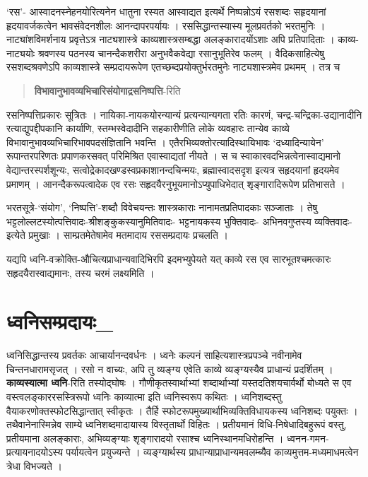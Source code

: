 ‘रस’- आस्वादनस्नेहनयोरित्यनेन धातुना रस्यत आस्वाद्यत इत्यर्थे निष्पन्नोऽयं रसशब्दः सहृदयानां हृदयावर्जकत्वेन भावसंवेदनशीलः आनन्दापरपर्यायः । रससिद्धान्तस्यास्य मूलप्रवर्तको भरतमुनिः । नाट्यांशविमर्शनाय प्रवृत्तेऽत्र नाट्यशास्त्रे काव्यशास्त्रसम्बद्धा अलङ्कारादयोंऽशाः अपि प्रतिपादिताः । काव्य-नाट्ययोः श्रवणस्य पठनस्य चानन्दैकशरीरा अनुभवैकवेद्या रसानुभूतिरेव फलम् । वैदिकसाहित्येषु रसशब्दश्रवणेऽपि काव्यशास्त्रे सम्प्रदायरूपेण एतच्छब्दप्रयोक्तुर्भरतमुनेः नाट्यशास्त्रमेव प्रथमम् । तत्र च 

\begin{verse}
\textbf{विभावानुभावव्यभिचारिसंयोगाद्रसनिष्पत्ति}-रिति 
\end{verse}

रसनिष्पत्तिप्रकारः सूत्रितः । नायिका-नायकयोरन्यान्यं प्रत्यन्यान्यगता रतिः कारणं, चन्द्र-चन्द्रिका-उद्यानादीनि रत्याद्युपद्दीपकानि कार्याणि, स्तम्भस्वेदादीनि सहकारीणीति लोके व्यवहारः तान्येव काव्ये विभावानुभावव्यभिचारिभावपदसंज्ञितानि भवन्ति । एतैरभिव्यक्तोरत्यादिस्थायिभावः ‘दध्यादिन्यायेन’ रूपान्तरपरिणतः प्रपाणकरसवत् परिमिश्रित एवास्वाद्यतां नीयते । स च स्वाकारवदभिन्नत्वेनास्वाद्यमानो वेद्यान्तरस्पर्शशून्यः, सत्वोद्रेकादखण्डस्वप्रकाशानन्दचिन्मयः, ब्रह्मास्वादसदृश इत्यत्र सहृदयानां हृदयमेव प्रमाणम् । आनन्दैकरूपत्वादेक एव रसः सहृदयैरनुभूयमानोऽप्युपाधिभेदात् शृङ्गारादिरूपेण प्रतिभासते ।

भरतसूत्रे-‘संयोग’, ‘निष्पत्ति’-शब्दौ विवेचयन्तः शास्त्रकाराः नानामतप्रतिपादकाः सञ्जाताः । तेषु भट्टलोल्लटस्योत्पत्तिवादः-श्रीशङ्कुकस्यानुमितिवादः- भट्टनायकस्य भुक्तिवादः- अभिनवगुप्तस्य व्यक्तिवादः-इत्येते प्रमुखाः । साम्प्रतमेतेषामेव मतमादाय रससम्प्रदायः प्रचलति ।

यद्यपि ध्वनि-वक्रोक्ति-औचित्यप्राधान्यवादिभिरपि इदमभ्युपेयते यत् काव्ये रस एव सारभूतश्चमत्कारः सहृदयैरास्वाद्यमानः, तस्य चरमं लक्ष्यमिति ।

\section*{ ध्वनिसम्प्रदायः\_}

ध्वनिसिद्धान्तस्य प्रवर्तकः आचार्यानन्दवर्धनः । ध्वनेः कल्पनं साहित्यशास्त्रप्रपञ्चे नवीनामेव चिन्तनधारामसृजत् । रसो न वाच्यः, अपि तु व्यङ्ग्य एवेति काव्ये व्यङ्ग्यस्यैव प्राधान्यं प्रदर्शितम् । \textbf{काव्यस्यात्मा ध्वनि}-रिति तस्योद्घोषः । गौणीकृतस्वार्थाभ्यां शब्दार्थाभ्यां यस्तदतिशयचार्वर्थो बोध्यते स एव वस्त्वलङ्काररसस्त्रिरूपो ध्वनिः काव्यात्मा इति ध्वनिस्वरूप कथितः । ध्वनिशब्दस्तु वैयाकरणोक्तस्फोटसिद्धान्तात् स्वीकृतः । तैर्हि स्फोटरूपमुख्यार्थाभिव्यक्तिविधायकस्य ध्वनिशब्दः पयुक्तः । तथैवानेनास्मिन्नेव साम्ये ध्वनिशब्दमादायास्य विस्तृतार्थो विहितः । प्रतीयमानं विधि-निषेधादिबहुरूपं वस्तु, प्रतीयमाना अलङ्काराः, अभिव्यङ्ग्याः शृङ्गारादयो रसाश्च ध्वनिस्थानमधिरोहन्ति । ध्वनन-गमन-प्रत्यायनादयोऽस्य पर्यायत्वेन प्रयुज्यन्ते । व्यङ्ग्यार्थस्य प्राधान्याप्राधान्यमवलम्ब्यैव काव्यमुत्तम-मध्यमाधमत्वेन त्रेधा विभज्यते ।

